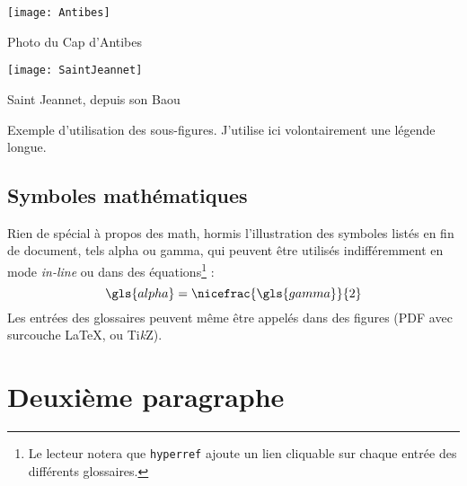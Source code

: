 	\begin{figureth}
		\begin{subfigureth}{0.4\textwidth}
			\texttt{[image: Antibes]}
			\caption{Photo du Cap d'Antibes}
				\label{sub:Antibes}
		\end{subfigureth}
		\begin{subfigureth}{0.4\textwidth}
			\texttt{[image: SaintJeannet]}
			\caption{Saint Jeannet, depuis son Baou}
				\label{sub:SaintJeannet}
		\end{subfigureth}
		\caption[Légende courte pour la figure]{Exemple d'utilisation des sous-figures. J'utilise ici volontairement une légende longue.}		
			\label{fig:exemple}
	\end{figureth}
	
	\subsection{Symboles mathématiques}
	Rien de spécial à propos des math, hormis l'illustration des symboles listés en fin de document, tels \gls{alpha} ou \gls{gamma}, qui peuvent être utilisés indifféremment en mode \emph{in-line} ou dans des équations\footnote{Le lecteur notera que \texttt{hyperref} ajoute un lien cliquable sur chaque entrée des différents glossaires.} :
	\begin{equation}
		\gls{alpha}=\nicefrac{\gls{gamma}}{2}
		\label{eq:alphagamma}
	\end{equation}
Les entrées des glossaires peuvent même être appelés dans des figures (PDF avec surcouche \LaTeX, ou Ti\textit{k}Z).
	

\section{Deuxième paragraphe}
\blindtext



